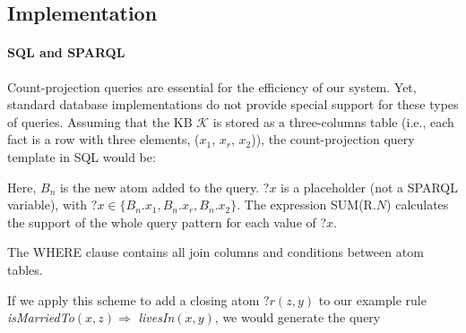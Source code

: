 \subsection{Implementation} \label{subsec:implementation}

\paragraph{SQL and SPARQL} Count-projection queries are essential for the efficiency of our system. Yet, standard database implementations do not provide special support for these types of queries. Assuming that the KB $\mathcal{K}$ is stored as a three-columns table
(i.e., each fact is a row with three elements, ($x_1$, $x_r$, $x_2$)), the count-projection query template in SQL would be:


Here, $B_n$ is the new atom added to the query. $?x$ is a placeholder (not a SPARQL variable), with $?x \in \{B_n.x_1, B_n.x_r, B_n.x_2\}$. 
The expression SUM(R.$N$) calculates the support of the whole query pattern for each value of $?x$.

The WHERE clause contains all join columns and conditions between atom tables.

If we apply this scheme to add a closing atom $?r(z,y)$ to our example rule
\emph{isMarriedTo}$(x,z) \Rightarrow $ \emph{livesIn}$(x,y)$, we would generate the query

